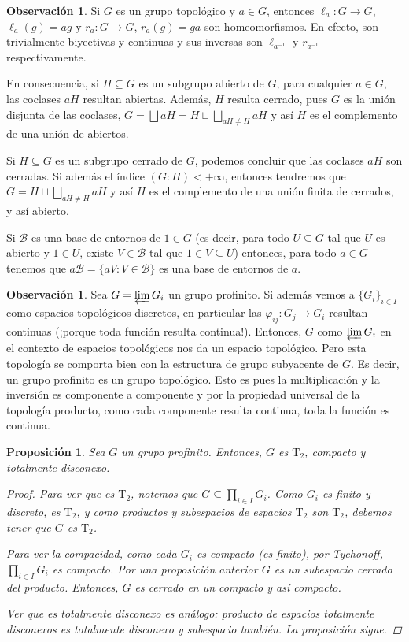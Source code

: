 \documentclass[12pt]{book}
\newtheorem{prop}[teo]{Proposición}
\theoremstyle{definition}
\newtheorem{obs}[teo]{Observación}
\begin{document}
\begin{obs}
Si $G$ es un grupo topológico y $a\in G$, entonces $\ell_a:G\to G$, $\ell_a(g)=ag$ y $r_a:G\to G$, $r_a(g)=ga$ son homeomorfismos. En efecto, son trivialmente biyectivas y continuas y sus inversas son $\ell_{a^{-1}}$ y $r_{a^{-1}}$ respectivamente.

En consecuencia, si $H\subseteq G$ es un subgrupo abierto de $G$, para cualquier $a\in G$, las coclases $aH$ resultan abiertas. Además, $H$ resulta cerrado, pues $G$ es la unión disjunta de las coclases, $G=\displaystyle\bigsqcup aH = H \sqcup \bigsqcup_{aH\neq H} aH$ y así $H$ es el complemento de una unión de abiertos.

Si $H\subseteq G$ es un subgrupo cerrado de $G$, podemos concluir que las coclases $aH$ son cerradas. Si además el índice $(G:H)<+\infty$, entonces tendremos que $G=H\sqcup \displaystyle\bigsqcup_{aH\neq H}aH$ y así $H$ es el complemento de una unión finita de cerrados, y así abierto.

Si $\mathscr{B}$ es una base de entornos de $1\in G$ (es decir, para todo $U\subseteq G$ tal que $U$ es abierto y $1\in U$, existe $V\in\mathscr{B}$ tal que $1\in V\subseteq U$) entonces, para todo $a\in G$ tenemos que $a\mathscr{B} = \{aV : V\in\mathscr{B}\}$ es una base de entornos de $a$.
\end{obs}

\begin{obs}
Sea $G=\varprojlim G_i$ un grupo profinito. Si además vemos a $\{G_i\}_{i\in I}$ como espacios topológicos discretos, en particular las $\varphi_{ij}:G_j\to G_i$ resultan continuas (¡porque toda función resulta continua!). Entonces, $G$ como $\varprojlim G_i$ en el contexto de espacios topológicos nos da un espacio topológico. Pero esta topología se comporta bien con la estructura de grupo subyacente de $G$. Es decir, un grupo profinito es un grupo topológico. Esto es pues la multiplicación y la inversión es componente a componente y por la propiedad universal de la topología producto, como cada componente resulta continua, toda la función es continua.
\end{obs}

\begin{prop}
Sea $G$ un grupo profinito. Entonces, $G$ es $\mathrm{T}_2$, compacto y totalmente disconexo.
\begin{proof}
Para ver que es $\mathrm{T}_2$, notemos que $G\subseteq\displaystyle\prod_{i\in I} G_i$. Como $G_i$ es finito y discreto, es $\mathrm{T}_2$, y como productos y subespacios de espacios $\mathrm{T}_2$ son $\mathrm{T}_2$, debemos tener que $G$ es $\mathrm{T}_2$.

Para ver la compacidad, como cada $G_i$ es compacto (es finito), por Tychonoff, $\displaystyle\prod_{i\in I}G_i$ es compacto. Por una proposición anterior $G$ es un subespacio cerrado del producto. Entonces, $G$ es cerrado en un compacto y así compacto.

Ver que es totalmente disconexo es análogo: producto de espacios totalmente disconexos es totalmente disconexo y subespacio también. La proposición sigue.
\end{proof}
\end{prop}
\end{document}
